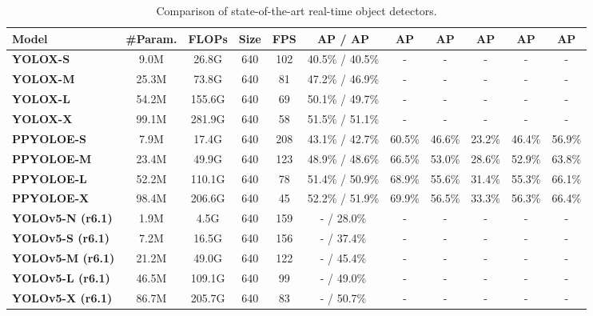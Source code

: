 \documentclass[10pt,twocolumn,letterpaper]{article}
\begin{document}
		\begin{table*}[t]
			\centering
			\begin{threeparttable}[t]
				\footnotesize
				\caption{Comparison of state-of-the-art real-time object detectors.}
				\label{table:sota}
\begin{tabular}{l|c|c|c|c|c|ccccc}
					\toprule
					\textbf{Model} & \textbf{\#Param.} & \textbf{FLOPs} & \textbf{Size} & \textbf{FPS} & \textbf{AP} / \textbf{AP} & \textbf{AP} & \textbf{AP} & \textbf{AP} & \textbf{AP} & \textbf{AP} \\	
					\midrule
\textbf{YOLOX-S \cite{ge2021yolox}} & 9.0M & 26.8G & 640 & 102 & 40.5\% / 40.5\% & - & - & - & - & - \\
					\textbf{YOLOX-M \cite{ge2021yolox}} & 25.3M & 73.8G & 640 & 81 & 47.2\% / 46.9\% & - & - & - & - & - \\
					\textbf{YOLOX-L \cite{ge2021yolox}} & 54.2M & 155.6G & 640 & 69 & 50.1\% / 49.7\% & - & - & - & - & - \\
					\textbf{YOLOX-X \cite{ge2021yolox}} & 99.1M & 281.9G & 640 & 58 & 51.5\% / 51.1\% & - & - & - & - & - \\
					\midrule
					\textbf{PPYOLOE-S \cite{xu2022pp}} & 7.9M & 17.4G & 640 & 208 & 43.1\% / 42.7\% & 60.5\% & 46.6\% & 23.2\% & 46.4\% & 56.9\% \\
					\textbf{PPYOLOE-M \cite{xu2022pp}} & 23.4M & 49.9G & 640 & 123 & 48.9\% / 48.6\% & 66.5\% & 53.0\% & 28.6\% & 52.9\% & 63.8\% \\
					\textbf{PPYOLOE-L \cite{xu2022pp}} & 52.2M & 110.1G & 640 & 78 & 51.4\% / 50.9\% & 68.9\% & 55.6\% & 31.4\% & 55.3\% & 66.1\% \\
					\textbf{PPYOLOE-X \cite{xu2022pp}} & 98.4M & 206.6G & 640 & 45 & 52.2\% / 51.9\% & 69.9\% & 56.5\% & 33.3\% & 56.3\% & 66.4\% \\
					\midrule
					\textbf{YOLOv5-N (r6.1) \cite{glenn2022yolov5}} & 1.9M & 4.5G & 640 & 159 & - / 28.0\% & - & - & - & - & - \\
					\textbf{YOLOv5-S (r6.1) \cite{glenn2022yolov5}} & 7.2M & 16.5G & 640 & 156 & - / 37.4\% & - & - & - & - & - \\
					\textbf{YOLOv5-M (r6.1) \cite{glenn2022yolov5}} & 21.2M & 49.0G & 640 & 122 & - / 45.4\% & - & - & - & - & - \\
					\textbf{YOLOv5-L (r6.1) \cite{glenn2022yolov5}} & 46.5M & 109.1G & 640 & 99 & - / 49.0\% & - & - & - & - & - \\
					\textbf{YOLOv5-X (r6.1) \cite{glenn2022yolov5}} & 86.7M & 205.7G & 640 & 83 & - / 50.7\% & - & - & - & - & - \\

\end{tabular}
\end{threeparttable}
\end{table*}
\end{document}
